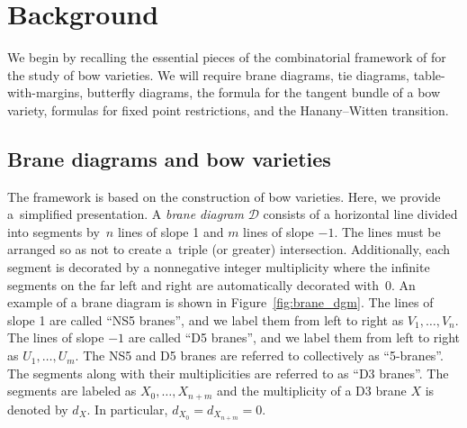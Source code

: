 \documentclass[11pt]{article}
\numberwithin{equation}{section}
\newcommand{\brane}{\mathcal D}
\begin{document}
\section{Background} \label{sec:background}
We begin by recalling the essential pieces of the combinatorial framework of \cite{RS} for the study of bow varieties. We will require brane diagrams, tie diagrams, table-with-margins, butterfly diagrams, the formula for the tangent bundle of a bow variety, formulas for fixed point restrictions, and the Hanany--Witten transition.

\subsection{Brane diagrams and bow varieties}
The \cite{RS} framework is based on the \cite{NT} construction of bow varieties. Here, we provide a~simplified presentation. A \textit{brane diagram} $\brane$ consists of a horizontal line divided into segments by~$n$ lines of slope 1 and $m$ lines of slope $-1$. The lines must be arranged so as not to create a~triple (or greater) intersection. Additionally, each segment is decorated by a nonnegative integer multiplicity where the infinite segments on the far left and right are automatically decorated with~0. An example of a brane diagram is shown in Figure~\ref{fig:brane_dgm}. The lines of slope 1 are called ``NS5 branes'', and we label them from left to right as $V_1, \dots , V_n$. The lines of slope $-1$ are called ``D5 branes'', and we label them from left to right as $U_1, \dots , U_m$. The NS5 and D5 branes are referred to collectively as ``5-branes''. The segments along with their multiplicities are referred to as ``D3 branes''. The segments are labeled as $X_0, \dots , X_{n + m}$ and the multiplicity of a D3 brane $X$ is denoted by $d_X$. In particular, $d_{X_0} = d_{X_{n + m}} = 0$.
\end{document}
